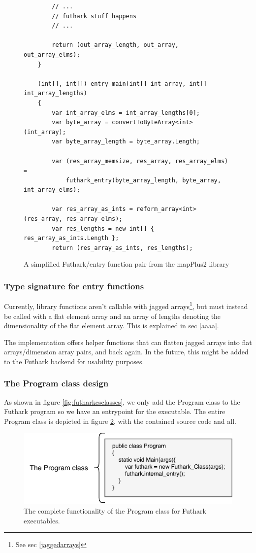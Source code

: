 \begin{description}
\begin{figure}[H]
\begin{verbatim}
        // ...
        // futhark stuff happens
        // ...

        return (out_array_length, out_array, out_array_elms);
    }

    (int[], int[]) entry_main(int[] int_array, int[] int_array_lengths)
    {
        var int_array_elms = int_array_lengths[0];
        var byte_array = convertToByteArray<int>(int_array);
        var byte_array_length = byte_array.Length;

        var (res_array_memsize, res_array, res_array_elms) =
            futhark_entry(byte_array_length, byte_array, int_array_elms);

        var res_array_as_ints = reform_array<int>(res_array, res_array_elms);
        var res_lengths = new int[] { res_array_as_ints.Length };
        return (res_array_as_ints, res_lengths);
\end{verbatim}
  \caption{A simplified Futhark/entry function pair from the mapPlus2 library}
  \label{fig:futharkentrypairlib}
\end{figure}

\subsubsection{Type signature for entry functions}
Currently, library functions aren't callable with jagged arrays\footnote{See sec
\ref{jaggedarrays}}, but must instead be called with a flat element array and an
array of lengths denoting the dimensionality of the flat element array. This is
explained in sec \ref{aaaa}.

The \fshark{} implementation offers helper functions that can flatten jagged
arrays into flat arrays/dimension array pairs, and back again.
In the future, this might be added to the Futhark \csharp{} backend for
usability purposes.

\clearpage

\subsubsection{The Program class design}
As shown in figure \ref{fig:futharkcsclasses}, we only add the Program class to
the Futhark program so we have an entrypoint for the executable.
The entire Program class is depicted in figure \ref{fig:programclass}, with the
contained source code and all.

\begin{figure}[H]
  \centering
  \includegraphics{chapters/figs/csharp/program_class.pdf}
  \caption{The complete functionality of the Program class for Futhark
    executables.}
  \label{fig:programclass}
\end{figure}


\end{description}
